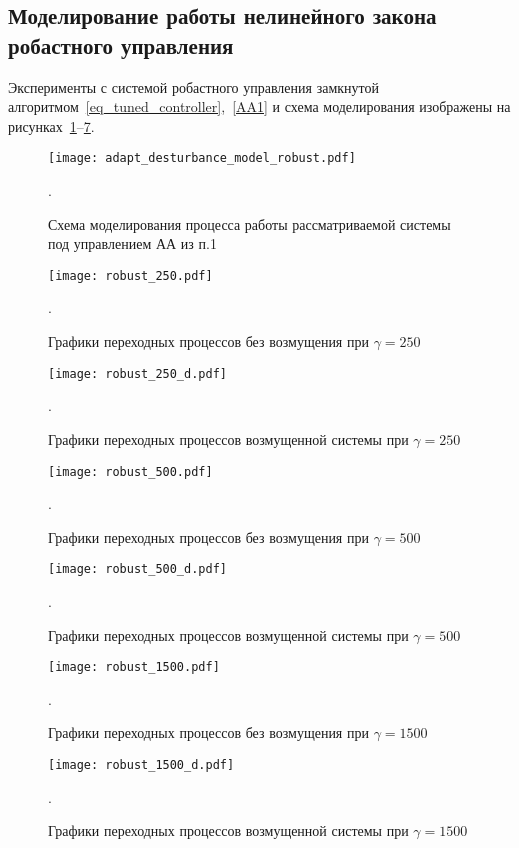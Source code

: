 \subsection{Моделирование работы нелинейного закона робастного управления}
Эксперименты с системой робастного управления замкнутой алгоритмом~\ref{eq_tuned_controller},~\ref{AA1} и схема моделирования изображены на рисунках~\ref{img_robust}--\ref{img_r1500d}.
	
\begin{figure}[h!]
	\centering
	\texttt{[image: adapt\_desturbance\_model\_robust.pdf]}
	\caption{Схема моделирования процесса работы рассматриваемой системы под управлением АА из п.1}.
	\label{img_robust}
\end{figure}

\begin{figure}[h!]
	\centering
	\texttt{[image: robust\_250.pdf]}
	\caption{Графики переходных процессов без возмущения при $\gamma = 250$}.
	\label{img_r250}
\end{figure}

\begin{figure}[h!]
	\centering
	\texttt{[image: robust\_250\_d.pdf]}
	\caption{Графики переходных процессов возмущенной системы при $\gamma = 250$}.
	\label{img_r250d}
\end{figure}

\begin{figure}[h!]
	\centering
	\texttt{[image: robust\_500.pdf]}
	\caption{Графики переходных процессов без возмущения при $\gamma = 500$}.
	\label{img_r500}
\end{figure}

\begin{figure}[h!]
	\centering
	\texttt{[image: robust\_500\_d.pdf]}
	\caption{Графики переходных процессов возмущенной системы при $\gamma = 500$}.
	\label{img_r500d}
\end{figure}

\begin{figure}[h!]
	\centering
	\texttt{[image: robust\_1500.pdf]}
	\caption{Графики переходных процессов без возмущения при $\gamma = 1500$}.
	\label{img_r1500}
\end{figure}

\begin{figure}[h!]
	\centering
	\texttt{[image: robust\_1500\_d.pdf]}
	\caption{Графики переходных процессов возмущенной системы при $\gamma = 1500$}.
	\label{img_r1500d}
\end{figure}


